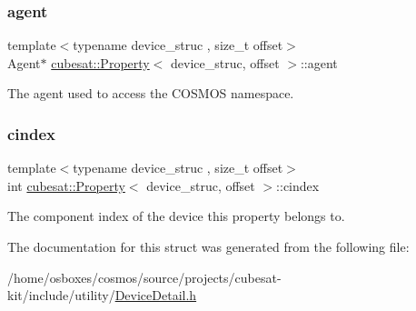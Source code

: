 \subsubsection{\texorpdfstring{agent}{agent}}
{\footnotesize\ttfamily template$<$typename device\+\_\+struc , size\+\_\+t offset$>$ \\
Agent$\ast$ \hyperlink{structcubesat_1_1Property}{cubesat\+::\+Property}$<$ device\+\_\+struc, offset $>$\+::agent\hspace{0.3cm}{\ttfamily [private]}}



The agent used to access the C\+O\+S\+M\+OS namespace. 

\mbox{\label{structcubesat_1_1Property_a69c661b3e78deee31af23956fc6130c5}} 
\subsubsection{\texorpdfstring{cindex}{cindex}}
{\footnotesize\ttfamily template$<$typename device\+\_\+struc , size\+\_\+t offset$>$ \\
int \hyperlink{structcubesat_1_1Property}{cubesat\+::\+Property}$<$ device\+\_\+struc, offset $>$\+::cindex\hspace{0.3cm}{\ttfamily [private]}}



The component index of the device this property belongs to. 



The documentation for this struct was generated from the following file\+:\begin{DoxyCompactItemize}
\item 
/home/osboxes/cosmos/source/projects/cubesat-\/kit/include/utility/\hyperlink{DeviceDetail_8h}{Device\+Detail.\+h}\end{DoxyCompactItemize}
